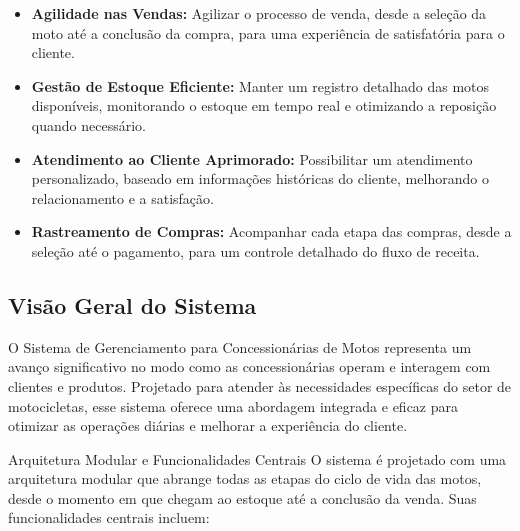 		\begin{itemize}
			\item \textbf{Agilidade nas Vendas:}  Agilizar o processo de venda, desde a seleção da moto até a conclusão da compra, para uma experiência de satisfatória para o cliente.
			
			\item \textbf{Gestão de Estoque Eficiente:} Manter um registro detalhado das motos disponíveis, monitorando o estoque em tempo real e otimizando a reposição quando necessário.
			
			\item \textbf{Atendimento ao Cliente Aprimorado:} Possibilitar um atendimento personalizado, baseado em informações históricas do cliente, melhorando o relacionamento e a satisfação.
			
			\item \textbf{Rastreamento de Compras:} Acompanhar cada etapa das compras, desde a seleção até o pagamento, para um controle detalhado do fluxo de receita.
			
		\end{itemize}
		 
        \subsection{Visão Geral do Sistema}
        O Sistema de Gerenciamento para Concessionárias de Motos representa um avanço significativo no modo como as concessionárias operam e interagem com clientes e produtos. Projetado para atender às necessidades específicas do setor de motocicletas, esse sistema oferece uma abordagem integrada e eficaz para otimizar as operações diárias e melhorar a experiência do cliente.
        
        Arquitetura Modular e Funcionalidades Centrais
        O sistema é projetado com uma arquitetura modular que abrange todas as etapas do ciclo de vida das motos, desde o momento em que chegam ao estoque até a conclusão da venda. Suas funcionalidades centrais incluem:
        
